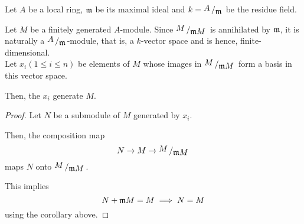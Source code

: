 \begin{proposition}{}{}
	Let \(A\) be a local ring, \(\mathfrak{m}\) be its maximal ideal and
	\(k = \bigslant{A}{\mfm}\) be the residue field.

	Let \(M\) be a finitely generated \(A\)-module.
	Since \(\bigslant{M}{\mfm M}\) is annihilated by \(\mathfrak{m}\), it is
	naturally a \(\bigslant{A}{\mfm}\)-module, that is, a \(k\)-vector space
	and is hence, finite-dimensional. \\

	Let \(x_i(1 \leq i \leq n)\) be elements of \(M\) whose images in
	\(\bigslant{M}{\mfm M}\) form a basis in this vector space.

	Then, the \(x_i\) generate \(M\).
\end{proposition}

\begin{proof}
	Let \(N\) be a submodule of \(M\) generated by \(x_i\).

	Then, the composition map
	\[
		N \to M \to \bigslant{M}{\mfm M}
	\]
	maps \(N\) onto \(\bigslant{M}{\mfm M}\).

	This implies
	\[
		N + \mathfrak{m} M = M \implies N = M
	\]
	using the corollary above.
\end{proof}

